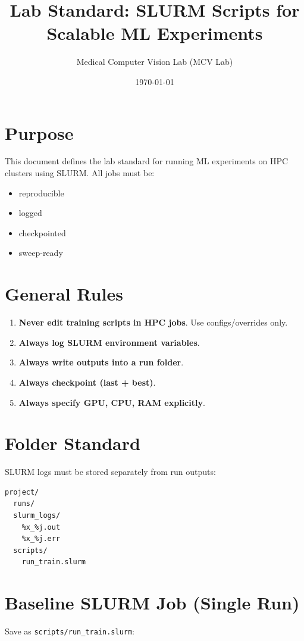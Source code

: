 \documentclass[11pt]{article}
\title{\textbf{Lab Standard: SLURM Scripts for Scalable ML Experiments}}
\author{Medical Computer Vision Lab (MCV Lab)}
\date{\today}
\begin{document}
\maketitle

\section{Purpose}
This document defines the lab standard for running ML experiments on HPC clusters using SLURM.
All jobs must be:
\begin{itemize}[nosep]
    \item reproducible
    \item logged
    \item checkpointed
    \item sweep-ready
\end{itemize}

\section{General Rules}
\begin{enumerate}[label=\textbf{S\arabic*.}, leftmargin=*]
    \item \textbf{Never edit training scripts in HPC jobs}. Use configs/overrides only.
    \item \textbf{Always log SLURM environment variables}.
    \item \textbf{Always write outputs into a run folder}.
    \item \textbf{Always checkpoint (last + best)}.
    \item \textbf{Always specify GPU, CPU, RAM explicitly}.
\end{enumerate}

\section{Folder Standard}
SLURM logs must be stored separately from run outputs:

\begin{lstlisting}
project/
  runs/
  slurm_logs/
    %x_%j.out
    %x_%j.err
  scripts/
    run_train.slurm
\end{lstlisting}

\section{Baseline SLURM Job (Single Run)}
Save as \texttt{scripts/run\_train.slurm}:
\end{document}

